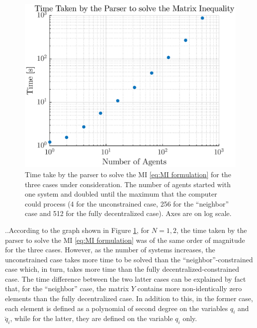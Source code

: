 \documentclass[10pt,twocolumn,twoside]{IEEEtran}
\newcounter{para}
\newcommand\mypara{\par \thesection.\refstepcounter{para}\thepara.\space}
\theoremstyle{plain}
\theoremstyle{definition}
\theoremstyle{remark}
\begin{document}
\begin{figure}[htpb!]
	\centering
	\includegraphics[width=\columnwidth]{./imgs/ParserTime}
	\caption{Time take by the parser to solve the MI \eqref{eq:MI formulation} for the three cases under consideration. The number of agents started with one system and doubled  until the maximum that the computer could process (4 for the unconstrained case, 256 for the ``neighbor'' case and 512 for the fully decentralized case). Axes are on log scale.}
	\label{fig:time graph}
\end{figure}

\mypara According to the graph shown in Figure \ref{fig:time graph}, for $N=1,2$, the time taken by the parser to solve the MI \eqref{eq:MI formulation} was of the same order of magnitude for the three cases. However, as the number of systems increases, the unconstrained case takes more time to be solved than the ``neighbor''-constrained case which, in turn, takes more time than the fully decentralized-constrained case. The time difference between the two latter cases can be explained by fact that, for the ``neighbor'' case, the matrix $Y$ contains more non-identically zero elements than the fully decentralized case. In addition to this, in the former case, each element is defined as a polynomial of second degree on the variables $q_i$ and $\breve{q}_i$, while for the latter, they are defined on the variable $q_i$ only.
\end{document}
